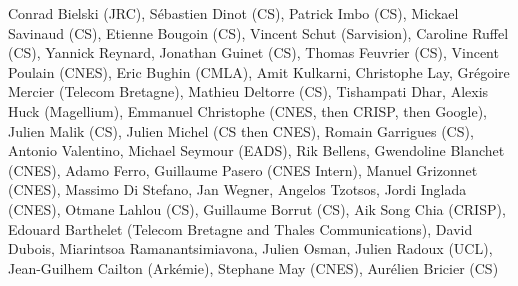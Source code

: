 Conrad Bielski (JRC), S\'ebastien Dinot (CS), Patrick Imbo (CS), Mickael Savinaud (CS), Etienne Bougoin (CS), Vincent Schut (Sarvision), Caroline Ruffel (CS), Yannick Reynard, Jonathan Guinet (CS), Thomas Feuvrier (CS), Vincent Poulain (CNES), Eric Bughin (CMLA), Amit Kulkarni, Christophe Lay, Gr\'egoire Mercier (Telecom Bretagne), Mathieu Deltorre (CS), Tishampati Dhar, Alexis Huck (Magellium), Emmanuel Christophe (CNES, then CRISP, then Google), Julien Malik (CS), Julien Michel (CS then CNES), Romain Garrigues (CS), Antonio Valentino, Michael Seymour (EADS), Rik Bellens, Gwendoline Blanchet (CNES), Adamo Ferro, Guillaume Pasero (CNES Intern), Manuel Grizonnet (CNES), Massimo Di Stefano, Jan Wegner, Angelos Tzotsos, Jordi Inglada (CNES), Otmane Lahlou (CS), Guillaume Borrut (CS), Aik Song Chia (CRISP), Edouard Barthelet (Telecom Bretagne and Thales Communications), David Dubois, Miarintsoa Ramanantsimiavona, Julien Osman, Julien Radoux (UCL), Jean-Guilhem Cailton (Ark\'emie), Stephane May (CNES), Aur\'elien Bricier (CS)
